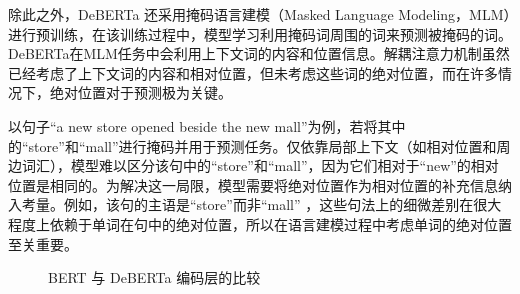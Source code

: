 除此之外，DeBERTa 还采用掩码语言建模（Masked Language Modeling，MLM）进行预训练，在该训练过程中，模型学习利用掩码词周围的词来预测被掩码的词。DeBERTa在MLM任务中会利用上下文词的内容和位置信息。解耦注意力机制虽然已经考虑了上下文词的内容和相对位置，但未考虑这些词的绝对位置，而在许多情况下，绝对位置对于预测极为关键。

以句子“a new store opened beside the new mall”为例，若将其中的“store”和“mall”进行掩码并用于预测任务。仅依靠局部上下文（如相对位置和周边词汇），模型难以区分该句中的“store”和“mall”，因为它们相对于“new”的相对位置是相同的。为解决这一局限，模型需要将绝对位置作为相对位置的补充信息纳入考量。例如，该句的主语是“store”而非“mall” ，这些句法上的细微差别在很大程度上依赖于单词在句中的绝对位置，所以在语言建模过程中考虑单词的绝对位置至关重要。

\begin{figure}[htbp]
\centering  
{}
\hfill
{}

\caption{BERT 与 DeBERTa 编码层的比较}
\label{fig:emd}
\end{figure}

